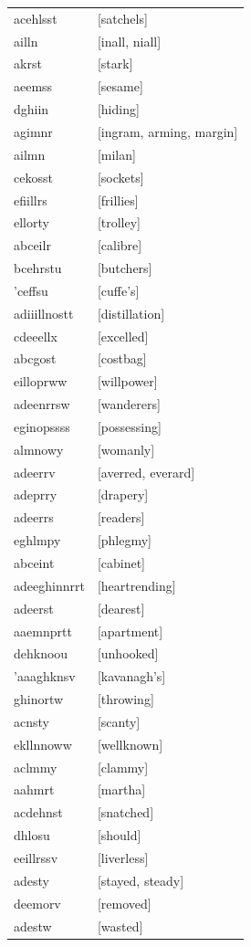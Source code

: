 \documentclass{article}
\begin{document}
\begin{tabular}{ll}
acehlsst & [satchels] \\
ailln & [inall, niall] \\
akrst & [stark] \\
aeemss & [sesame] \\
dghiin & [hiding] \\
agimnr & [ingram, arming, margin] \\
ailmn & [milan] \\
cekosst & [sockets] \\
efiillrs & [frillies] \\
ellorty & [trolley] \\
abceilr & [calibre] \\
bcehrstu & [butchers] \\
'ceffsu & [cuffe's] \\
adiiillnostt & [distillation] \\
cdeeellx & [excelled] \\
abcgost & [costbag] \\
eilloprww & [willpower] \\
adeenrrsw & [wanderers] \\
eginopssss & [possessing] \\
almnowy & [womanly] \\
adeerrv & [averred, everard] \\
adeprry & [drapery] \\
adeerrs & [readers] \\
eghlmpy & [phlegmy] \\
abceint & [cabinet] \\
adeeghinnrrt & [heartrending] \\
adeerst & [dearest] \\
aaemnprtt & [apartment] \\
dehknoou & [unhooked] \\
'aaaghknsv & [kavanagh's] \\
ghinortw & [throwing] \\
acnsty & [scanty] \\
ekllnnoww & [wellknown] \\
aclmmy & [clammy] \\
aahmrt & [martha] \\
acdehnst & [snatched] \\
dhlosu & [should] \\
eeillrssv & [liverless] \\
adesty & [stayed, steady] \\
deemorv & [removed] \\
adestw & [wasted] \\

\end{tabular}
\end{document}

